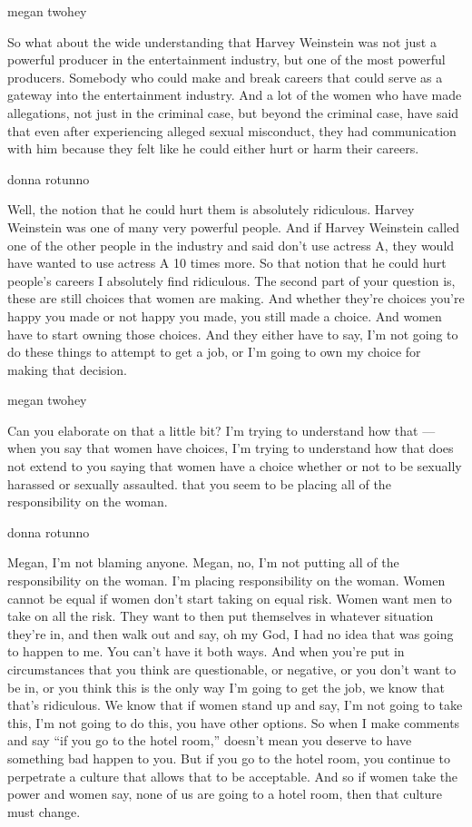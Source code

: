 megan twohey

So what about the wide understanding that Harvey Weinstein was not just
a powerful producer in the entertainment industry, but one of the most
powerful producers. Somebody who could make and break careers that could
serve as a gateway into the entertainment industry. And a lot of the
women who have made allegations, not just in the criminal case, but
beyond the criminal case, have said that even after experiencing alleged
sexual misconduct, they had communication with him because they felt
like he could either hurt or harm their careers.

donna rotunno

Well, the notion that he could hurt them is absolutely ridiculous.
Harvey Weinstein was one of many very powerful people. And if Harvey
Weinstein called one of the other people in the industry and said don't
use actress A, they would have wanted to use actress A 10 times more. So
that notion that he could hurt people's careers I absolutely find
ridiculous. The second part of your question is, these are still choices
that women are making. And whether they're choices you're happy you made
or not happy you made, you still made a choice. And women have to start
owning those choices. And they either have to say, I'm not going to do
these things to attempt to get a job, or I'm going to own my choice for
making that decision.

megan twohey

Can you elaborate on that a little bit? I'm trying to understand how
that --- when you say that women have choices, I'm trying to understand
how that does not extend to you saying that women have a choice whether
or not to be sexually harassed or sexually assaulted. that you seem to
be placing all of the responsibility on the woman.

donna rotunno

Megan, I'm not blaming anyone. Megan, no, I'm not putting all of the
responsibility on the woman. I'm placing responsibility on the woman.
Women cannot be equal if women don't start taking on equal risk. Women
want men to take on all the risk. They want to then put themselves in
whatever situation they're in, and then walk out and say, oh my God, I
had no idea that was going to happen to me. You can't have it both ways.
And when you're put in circumstances that you think are questionable, or
negative, or you don't want to be in, or you think this is the only way
I'm going to get the job, we know that that's ridiculous. We know that
if women stand up and say, I'm not going to take this, I'm not going to
do this, you have other options. So when I make comments and say ``if
you go to the hotel room,'' doesn't mean you deserve to have something
bad happen to you. But if you go to the hotel room, you continue to
perpetrate a culture that allows that to be acceptable. And so if women
take the power and women say, none of us are going to a hotel room, then
that culture must change.

